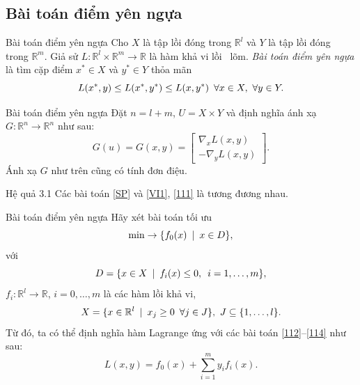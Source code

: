 \documentclass[aspectratio=169]{beamer}
\theoremstyle{plain}
\theoremstyle{definition}
\theoremstyle{remark}
\begin{document}
\subsection{Bài toán điểm yên ngựa}
\begin{frame}{Bài toán điểm yên ngựa}\pause
    Cho $X$ là tập lồi đóng trong $\mathbb{R}^l$ và $Y$ là tập lồi đóng trong $\mathbb{R}^m$. Giả sử $L: \mathbb{R}^l\times\mathbb{R}^m\to\mathbb{R}$ là hàm khả vi lồi \textendash\ lõm. \textit{Bài toán điểm yên ngựa} là tìm cặp điểm $x^*\in X$ và $y^*\in Y$ thỏa mãn
\begin{equation}
    L(x^*,y)\leq L(x^*,y^*)\leq L(x,y^*)\enskip\forall x\in X, \ \forall y\in Y .\label{SP}
\end{equation}
\end{frame}

\begin{frame}{Bài toán điểm yên ngựa}
Đặt $n=l+m$, $U=X\times Y$ và định nghĩa ánh xạ $G: \mathbb{R}^n\to\mathbb{R}^n$ như sau:
\begin{equation}
    G(u)=G(x,y)=\begin{bmatrix}
    \nabla_xL(x,y) \\ -\nabla_yL(x,y)
    \end{bmatrix}.\label{111}
\end{equation}
Ánh xạ $G$ như trên cũng có tính đơn điệu.
\begin{block}{Hệ quả 3.1}
 Các bài toán \eqref{SP} và \eqref{VI1}, \eqref{111} là tương đương nhau.
\end{block}
\end{frame}

\begin{frame}{Bài toán điểm yên ngựa}
    Hãy xét bài toán tối ưu
\begin{equation}
    \min\to\{f_0(x)\enskip|\enskip x\in D\}, \label{112}
\end{equation}
với 
\begin{equation}
    D=\{x\in X\enskip|\enskip f_i(x)\leq 0,\enskip i=1,\ldots,m\}, \label{113}
\end{equation}
$f_i: \mathbb{R}^l\to\mathbb{R}$, $i=0,\ldots,m$ là các hàm lồi khả vi, 
\begin{equation}
    X=\{x\in\mathbb{R}^l\enskip|\enskip x_j\geq 0\enskip\forall j\in J\},\ J\subseteq\{1,\ldots,l\}.\label{114}
\end{equation}
Từ đó, ta có thể định nghĩa hàm Lagrange ứng với các bài toán \eqref{112}--\eqref{114} như sau:
\begin{equation}
    L(x,y) = f_0(x) + \sum_{i=1}^m y_if_i(x). \label{115}
\end{equation}
\end{frame}
\end{document}
